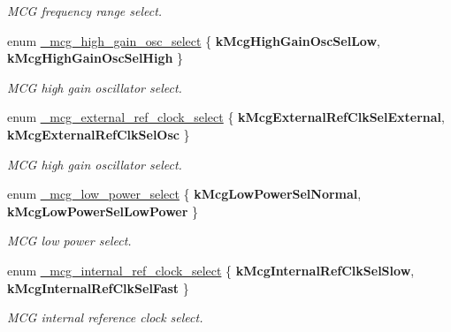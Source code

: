 \begin{DoxyCompactItemize}
\begin{DoxyCompactList}\small\item\em M\+CG frequency range select. \end{DoxyCompactList}
\item 
enum \hyperlink{group__mcg__hal_gaeab01c9e03d024b157294ff39a9f1708}{\+\_\+mcg\+\_\+high\+\_\+gain\+\_\+osc\+\_\+select} \{ {\bfseries k\+Mcg\+High\+Gain\+Osc\+Sel\+Low}, 
{\bfseries k\+Mcg\+High\+Gain\+Osc\+Sel\+High}
 \}\hypertarget{group__mcg__hal_gaeab01c9e03d024b157294ff39a9f1708}{}\label{group__mcg__hal_gaeab01c9e03d024b157294ff39a9f1708}
\begin{DoxyCompactList}\small\item\em M\+CG high gain oscillator select. \end{DoxyCompactList}
\item 
enum \hyperlink{group__mcg__hal_ga1248a3efe4e5c66ad261e731a0f4576c}{\+\_\+mcg\+\_\+external\+\_\+ref\+\_\+clock\+\_\+select} \{ {\bfseries k\+Mcg\+External\+Ref\+Clk\+Sel\+External}, 
{\bfseries k\+Mcg\+External\+Ref\+Clk\+Sel\+Osc}
 \}\hypertarget{group__mcg__hal_ga1248a3efe4e5c66ad261e731a0f4576c}{}\label{group__mcg__hal_ga1248a3efe4e5c66ad261e731a0f4576c}
\begin{DoxyCompactList}\small\item\em M\+CG high gain oscillator select. \end{DoxyCompactList}
\item 
enum \hyperlink{group__mcg__hal_ga84d34e14fddefaba4e6c436b47694094}{\+\_\+mcg\+\_\+low\+\_\+power\+\_\+select} \{ {\bfseries k\+Mcg\+Low\+Power\+Sel\+Normal}, 
{\bfseries k\+Mcg\+Low\+Power\+Sel\+Low\+Power}
 \}\hypertarget{group__mcg__hal_ga84d34e14fddefaba4e6c436b47694094}{}\label{group__mcg__hal_ga84d34e14fddefaba4e6c436b47694094}
\begin{DoxyCompactList}\small\item\em M\+CG low power select. \end{DoxyCompactList}
\item 
enum \hyperlink{group__mcg__hal_ga21cfeb79f5fbb5bd48e4f66d5844e5a3}{\+\_\+mcg\+\_\+internal\+\_\+ref\+\_\+clock\+\_\+select} \{ {\bfseries k\+Mcg\+Internal\+Ref\+Clk\+Sel\+Slow}, 
{\bfseries k\+Mcg\+Internal\+Ref\+Clk\+Sel\+Fast}
 \}\hypertarget{group__mcg__hal_ga21cfeb79f5fbb5bd48e4f66d5844e5a3}{}\label{group__mcg__hal_ga21cfeb79f5fbb5bd48e4f66d5844e5a3}
\begin{DoxyCompactList}\small\item\em M\+CG internal reference clock select. \end{DoxyCompactList}

\end{DoxyCompactItemize}
